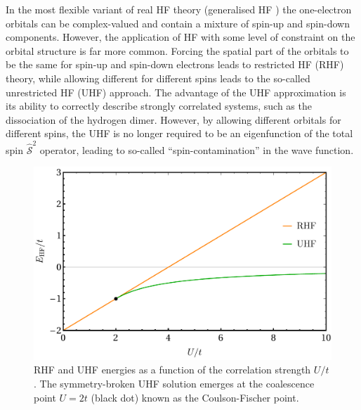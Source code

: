 \documentclass[aps,prb,reprint,noshowkeys,superscriptaddress]{revtex4-1}
\begin{document}
In the most flexible variant of real HF theory (generalised HF \cite{Mayer_1993}) the one-electron orbitals can be complex-valued
and contain a mixture of spin-up and spin-down components.\cite{Mayer_1993}
However, the application of HF with some level of constraint on the orbital structure is far more common.
Forcing the spatial part of the orbitals to be the same for spin-up and spin-down electrons leads to restricted HF (RHF) theory, while allowing different for different spins leads to the so-called unrestricted HF (UHF) approach.
The advantage of the UHF approximation is its ability to correctly describe strongly correlated systems, 
such as the dissociation of the hydrogen dimer.\cite{Coulson_1949}
However, by allowing different orbitals for different spins, the UHF is no longer required to be an eigenfunction of 
the total spin $\hat{\mathcal{S}}^2$ operator, leading to so-called ``spin-contamination'' in the wave function.

%
%

\begin{figure}
    \includegraphics[width=\linewidth]{HF_real.pdf}
    \caption{\label{fig:HF_real}
    RHF and UHF energies as a function of the correlation strength $U/t$. 
    The symmetry-broken UHF solution emerges at the coalescence point $U=2t$ (black dot) known as the Coulson-Fischer point.}
\end{figure}
\end{document}
